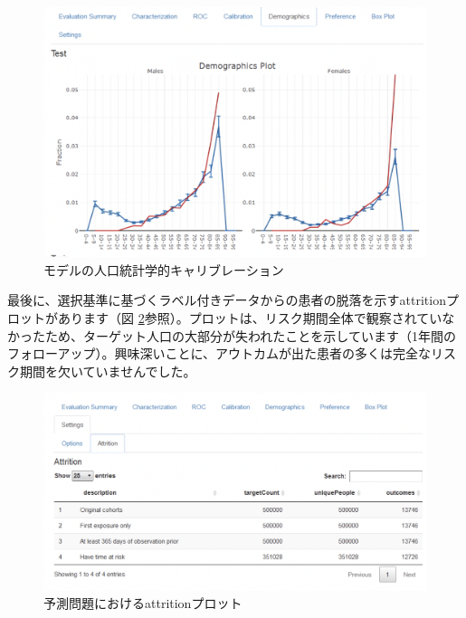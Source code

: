 \documentclass[
  11pt]{book}
\theoremstyle{definition}
\theoremstyle{definition}
\theoremstyle{definition}
\theoremstyle{definition}
\theoremstyle{remark}
\begin{document}
\begin{figure}

{\centering \includegraphics[width=1\linewidth]{images/PatientLevelPrediction/shiny/singleShiny/singleShinyDemo} 

}

\caption{モデルの人口統計学的キャリブレーション}\label{fig:shinyDemo}
\end{figure}

最後に、選択基準に基づくラベル付きデータからの患者の脱落を示すattritionプロットがあります（図 \ref{fig:shinyAtt}参照）。プロットは、リスク期間全体で観察されていなかったため、ターゲット人口の大部分が失われたことを示しています（1年間のフォローアップ）。興味深いことに、アウトカムが出た患者の多くは完全なリスク期間を欠いていませんでした。

\begin{figure}

{\centering \includegraphics[width=1\linewidth]{images/PatientLevelPrediction/shiny/singleShiny/singleShinyAtt} 

}

\caption{予測問題におけるattritionプロット}\label{fig:shinyAtt}
\end{figure}
\end{document}
